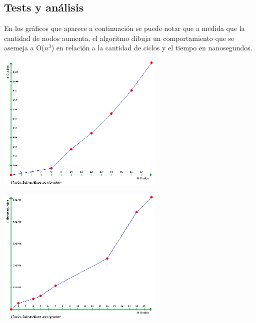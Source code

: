 \subsection{Tests y análisis}

En los gráficos que aparece a continuación  se puede notar que a medida que la cantidad de nodos aumenta, el algoritmo dibuja un comportamiento que se asemeja a O($n^3$) en relación a la cantidad de ciclos y el tiempo en nanosegundos.\\

\begin {center}
\includegraphics[width=8cm]{./graficos/goloso_1.png}
\end {center} 

\begin {center}
\includegraphics[width=8cm]{./graficos/goloso_2.png}
\end {center}
